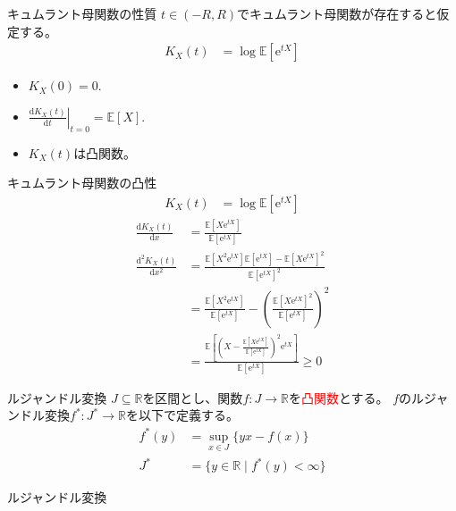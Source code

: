 \documentclass[lualatex,handout]{beamer}
\newcommand{\emm}[1]{\textcolor{red}{#1}}
\newcommand{\expt}[1]{\mathbb{E}\left[#1\right]}
\theoremstyle{definition}
\begin{document}
\begin{frame}{キュムラント母関数の性質}
$t\in(-R, R)$でキュムラント母関数が存在すると仮定する。
\begin{align*}
K_X(t) &= \log \expt{\mathrm{e}^{tX}}
\end{align*}
\begin{itemize}
\setlength{\itemsep}{2em}
\item $K_X(0) = 0$.
\item $\left.\frac{\mathrm{d}K_X(t)}{\mathrm{d} t}\right|_{t=0} = \expt{X}$.
\item $K_X(t)$は凸関数。
\end{itemize}
\end{frame}

\begin{frame}{キュムラント母関数の凸性}
\begin{align*}
K_X(t) &= \log \expt{\mathrm{e}^{tX}}
\end{align*}
\begin{align*}
\frac{\mathrm{d} K_X(t)}{\mathrm{d}x} &= \frac{\expt{X\mathrm{e}^{tX}}}{\expt{\mathrm{e}^{tX}}}\\
\frac{\mathrm{d}^2 K_X(t)}{\mathrm{d}x^2} &= \frac{\expt{X^2\mathrm{e}^{tX}}\expt{\mathrm{e}^{tX}}-\expt{X\mathrm{e}^{tX}}^2}{\expt{\mathrm{e}^{tX}}^2}\\
&= \frac{\expt{X^2\mathrm{e}^{tX}}}{\expt{\mathrm{e}^{tX}}}-\left(\frac{\expt{X\mathrm{e}^{tX}}^2}{\expt{\mathrm{e}^{tX}}}\right)^2\\
&= \frac{\expt{\left(X-\frac{\expt{X\mathrm{e}^{tX}}}{\expt{\mathrm{e}^{tX}}}\right)^2\mathrm{e}^{tX}}}{\expt{\mathrm{e}^{tX}}}\ge 0
\end{align*}
\end{frame}

\begin{frame}{ルジャンドル変換}
$J\subseteq\mathbb{R}$を区間とし、関数$f\colon J\to\mathbb{R}$を\emm{凸関数}とする。
$f$のルジャンドル変換$f^*\colon J^*\to\mathbb{R}$を以下で定義する。
\begin{align*}
f^*(y) &= \sup_{x\in J}\{yx - f(x)\}\\
J^*&=\{y\in\mathbb{R}\mid f^*(y)<\infty\}
\end{align*}
\end{frame}

\begin{frame}{ルジャンドル変換}
\centering
{}
\end{frame}
\end{document}
